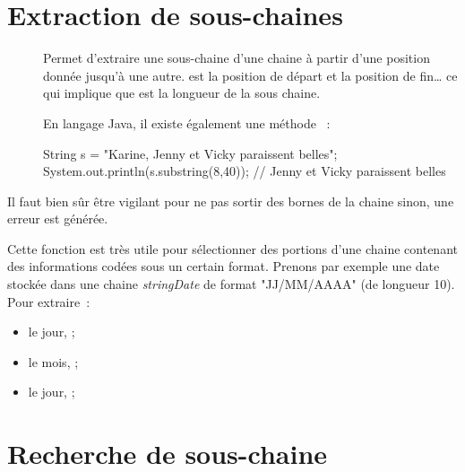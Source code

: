 \section{Extraction de sous-chaines}

	\begin{description}
	\item[]
		
		Permet d’extraire une sous-chaine d'une chaine à partir d'une position
		donnée jusqu'à une autre.  est la position de départ et
		 la position de fin… ce qui implique que  est la longueur de la sous chaine. 

		En langage Java, il existe également une méthode ~:

		\begin{java}
String s = "Karine, Jenny et Vicky paraissent belles";			
System.out.println(s.substring(8,40)); 
	// Jenny et Vicky paraissent belles
		\end{java}
	
	\end{description}

	Il faut bien sûr être vigilant pour ne pas sortir des bornes de la chaine
	sinon, une erreur est générée. 

	Cette fonction est très utile pour sélectionner des portions d’une chaine
	contenant des informations codées sous un certain format.  Prenons par
	exemple une date stockée dans une chaine \textit{stringDate} de format 
	"JJ/MM/AAAA" (de longueur 10).  Pour extraire~:
	
	\begin{itemize}
		\item le jour, ;
		\item le mois, ;
		\item le jour, ;
	\end{itemize}

	
\section{Recherche de sous-chaine}
	
